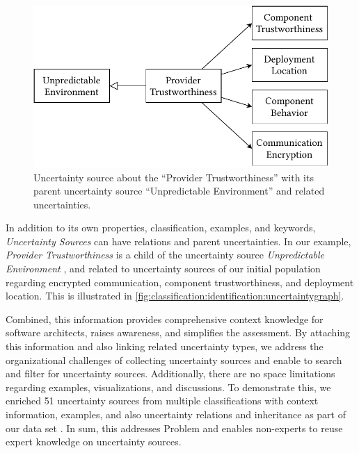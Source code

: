 \begin{figure}
    \centering
    \includegraphics[width=0.8\linewidth]{figures/chapter5/arc3n-relations.pdf}
    \caption{Uncertainty source about the \enquote{Provider Trustworthiness} with its parent uncertainty source \enquote{Unpredictable Environment} and related uncertainties.}
    \label{fig:classification:identification:uncertaintygraph}
\end{figure}

In addition to its own properties, classification, examples, and keywords, \emph{Uncertainty Sources} can have relations and parent uncertainties.
In our example, \emph{Provider Trustworthiness} is a child of the uncertainty source \emph{Unpredictable Environment} \cite{ramirez_taxonomy_2012}, and related to uncertainty sources of our initial population regarding encrypted communication, component trustworthiness, and deployment location.
This is illustrated in \autoref{fig:classification:identification:uncertaintygraph}.

Combined, this information provides comprehensive context knowledge for software architects, raises awareness, and simplifies the assessment.
By attaching this information and also linking related uncertainty types, we address the organizational challenges of collecting uncertainty sources and enable to search and filter for uncertainty sources.
Additionally, there are no space limitations regarding examples, visualizations, and discussions.
To demonstrate this, we enriched 51 uncertainty sources from multiple classifications \cite{hahner_classification_2023,ramirez_taxonomy_2012} with context information, examples, and also uncertainty relations and inheritance as part of our data set \cite{dataset}.
In sum, this addresses Problem  and enables non-experts to reuse expert knowledge on uncertainty sources.

